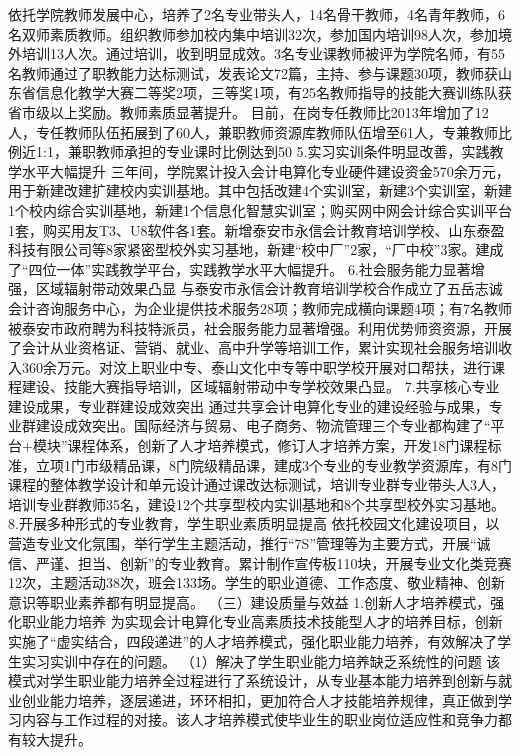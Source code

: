 依托学院教师发展中心，培养了2名专业带头人，14名骨干教师，4名青年教师，6名双师素质教师。组织教师参加校内集中培训32次，参加国内培训98人次，参加境外培训13人次。通过培训，收到明显成效。3名专业课教师被评为学院名师，有55名教师通过了职教能力达标测试，发表论文72篇，主持、参与课题30项，教师获山东省信息化教学大赛二等奖2项，三等奖1项，有25名教师指导的技能大赛训练队获省市级以上奖励。教师素质显著提升。
目前，在岗专任教师比2013年增加了12人，专任教师队伍拓展到了60人，兼职教师资源库教师队伍增至61人，专兼教师比例近1:1，兼职教师承担的专业课时比例达到50%
5.实习实训条件明显改善，实践教学水平大幅提升
三年间，学院累计投入会计电算化专业硬件建设资金570余万元，用于新建改建扩建校内实训基地。其中包括改建4个实训室，新建3个实训室，新建1个校内综合实训基地，新建1个信息化智慧实训室；购买网中网会计综合实训平台1套，购买用友T3、U8软件各1套。新增泰安市永信会计教育培训学校、山东泰盈科技有限公司等8家紧密型校外实习基地，新建“校中厂”2家，“厂中校”3家。建成了“四位一体”实践教学平台，实践教学水平大幅提升。
6.社会服务能力显著增强，区域辐射带动效果凸显
与泰安市永信会计教育培训学校合作成立了五岳志诚会计咨询服务中心，为企业提供技术服务28项；教师完成横向课题4项；有7名教师被泰安市政府聘为科技特派员，社会服务能力显著增强。利用优势师资资源，开展了会计从业资格证、营销、就业、高中升学等培训工作，累计实现社会服务培训收入360余万元。对汶上职业中专、泰山文化中专等中职学校开展对口帮扶，进行课程建设、技能大赛指导培训，区域辐射带动中专学校效果凸显。 
7.共享核心专业建设成果，专业群建设成效突出
通过共享会计电算化专业的建设经验与成果，专业群建设成效突出。国际经济与贸易、电子商务、物流管理三个专业都构建了“平台+模块”课程体系，创新了人才培养模式，修订人才培养方案，开发18门课程标准，立项1门市级精品课，8门院级精品课，建成3个专业的专业教学资源库，有8门课程的整体教学设计和单元设计通过课改达标测试，培训专业群专业带头人3人，培训专业群教师35名，建设12个共享型校内实训基地和8个共享型校外实习基地。
8.开展多种形式的专业教育，学生职业素质明显提高
依托校园文化建设项目，以营造专业文化氛围，举行学生主题活动，推行“7S”管理等为主要方式，开展“诚信、严谨、担当、创新”的专业教育。累计制作宣传板110块，开展专业文化类竞赛12次，主题活动38次，班会133场。学生的职业道德、工作态度、敬业精神、创新意识等职业素养都有明显提高。
（三）建设质量与效益
1.创新人才培养模式，强化职业能力培养
为实现会计电算化专业高素质技术技能型人才的培养目标，创新实施了“虚实结合，四段递进”的人才培养模式，强化职业能力培养，有效解决了学生实习实训中存在的问题。
（1）解决了学生职业能力培养缺乏系统性的问题
该模式对学生职业能力培养全过程进行了系统设计，从专业基本能力培养到创新与就业创业能力培养，逐层递进，环环相扣，更加符合人才技能培养规律，真正做到学习内容与工作过程的对接。该人才培养模式使毕业生的职业岗位适应性和竞争力都有较大提升。
